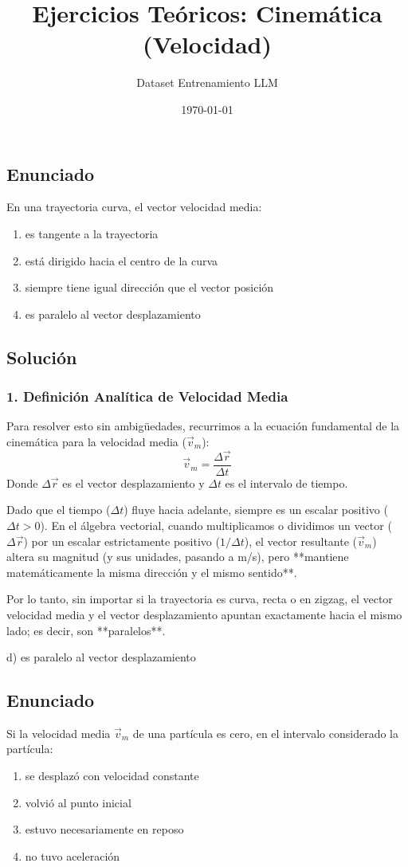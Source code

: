 \documentclass[12pt, a4paper]{article}
\title{Ejercicios Teóricos: Cinemática (Velocidad)}
\author{Dataset Entrenamiento LLM}
\date{\today}
\begin{document}
\subsection*{Enunciado}
En una trayectoria curva, el vector velocidad media:
\begin{enumerate}[label=\alph*)]
    \item es tangente a la trayectoria
    \item está dirigido hacia el centro de la curva
    \item siempre tiene igual dirección que el vector posición
    \item es paralelo al vector desplazamiento
\end{enumerate}

\subsection*{Solución}

\subsubsection*{1. Definición Analítica de Velocidad Media}
Para resolver esto sin ambigüedades, recurrimos a la ecuación fundamental de la cinemática para la velocidad media ($\vec{v}_m$):
$$ \vec{v}_m = \frac{\Delta \vec{r}}{\Delta t} $$
Donde $\Delta \vec{r}$ es el vector desplazamiento y $\Delta t$ es el intervalo de tiempo.

Dado que el tiempo ($\Delta t$) fluye hacia adelante, siempre es un escalar positivo ($\Delta t > 0$). 
En el álgebra vectorial, cuando multiplicamos o dividimos un vector ($\Delta \vec{r}$) por un escalar estrictamente positivo ($1/\Delta t$), el vector resultante ($\vec{v}_m$) altera su magnitud (y sus unidades, pasando a m/s), pero **mantiene matemáticamente la misma dirección y el mismo sentido**. 

Por lo tanto, sin importar si la trayectoria es curva, recta o en zigzag, el vector velocidad media y el vector desplazamiento apuntan exactamente hacia el mismo lado; es decir, son **paralelos**.

\begin{tcolorbox}[colback=green!5!white, colframe=green!50!black, title=Respuesta Final]
\centering \Large d) es paralelo al vector desplazamiento
\end{tcolorbox}

\newpage

\subsection*{Enunciado}
Si la velocidad media $\vec{v}_m$ de una partícula es cero, en el intervalo considerado la partícula:
\begin{enumerate}[label=\alph*)]
    \item se desplazó con velocidad constante
    \item volvió al punto inicial
    \item estuvo necesariamente en reposo
    \item no tuvo aceleración
\end{enumerate}
\end{document}
